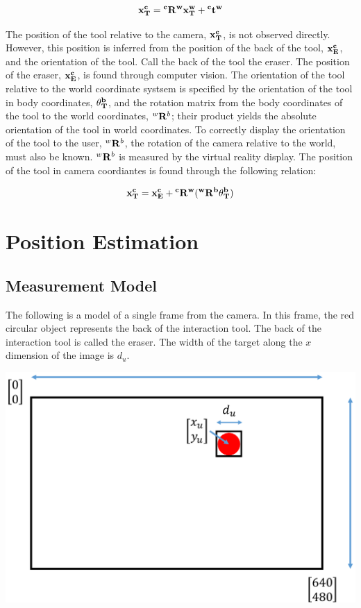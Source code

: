 \documentclass{article}
\newcommand{\xwT}{\bf{x}{^w_T}} %
\newcommand{\xcT}{\bf{x}{^c_T}} %
\newcommand{\xcE}{\bf{x}{^c_E}} %
\newcommand{\obT}{\bf{\theta}{^b_T}} %
\newcommand{\R}[2]{{^#1}{\bf{R}}{^#2}}
\newcommand{\T}[2]{{^#1}{\bf{t}}{^#2}}
\begin{document}
\begin{flushleft}
\[ \xcT = \R{c}{w} \xwT + \T{c}{w} \]

The position of the tool relative to the camera, $ \xcT $, is not observed directly. However, this position is inferred from the position of the back of the tool, $ \xcE $, and the orientation of the tool. Call the back of the tool the eraser. The position of the eraser, $\xcE$, is found through computer vision. The orientation of the tool relative to the world coordinate systsem is specified by the orientation of the tool in body coordinates, $\obT$, and the rotation matrix from the body coordinates of the tool to the world coordinates, $\R{w}{b}$; their product yields the absolute orientation of the tool in world coordinates. To correctly display the orientation of the tool to the user, $\R{w}{b}$, the rotation of the camera relative to the world, must also be known. $\R{w}{b}$ is measured by the virtual reality display. The position of the tool in camera coordiantes is found through the following relation: 

\[ \xcT = \xcE + \R{c}{w}(\R{w}{b}\obT) \]

\medskip
\section{Position Estimation}

\subsection{Measurement Model}

The following is a model of a single frame from the camera. In this frame, the red circular object represents the back of the interaction tool. The back of the interaction tool is called the eraser. The width of the target along the $x$ dimension of the image is $d_{u}$. 

\medskip

\begin{center}
    \includegraphics[scale=0.4]{computerVision}
\end{center}


\end{flushleft}
\end{document}

